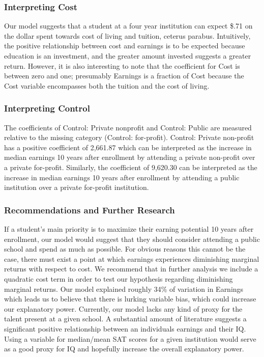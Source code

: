 \documentclass[%
 reprint,
 amsmath,amssymb,
 aps,
]{revtex4-1}
\begin{document}
\subsubsection{Interpreting Cost}
Our model suggests that a student at a four year institution can expect \$.71 on the dollar spent towards cost of living and tuition, ceterus parabus. Intuitively, the positive relationship between cost and earnings is to be expected because education is an investment, and the greater amount invested suggests a greater return. However, it is also interesting to note that the coefficient for Cost is between zero and one; presumably Earnings is a fraction of Cost because the Cost variable encompasses both the tuition and the cost of living. 

\subsubsection{Interpreting Control}
The coefficients of Control: Private nonprofit and Control: Public are measured relative to the missing category (Control: for-profit).  Control: Private non-profit has a positive coefficient of 2,661.87 which can be interpreted as the increase in median earnings 10 years after enrollment by attending a private non-profit over a private for-profit.  Similarly, the coefficient of 9,620.30 can be interpreted as the increase in median earnings 10 years after enrollment by attending a public institution over a private for-profit institution.


\subsubsection{Recommendations and Further Research}
If a student's main priority is to maximize their earning potential 10 years after enrollment, our model would suggest that they should consider attending a public school and spend as much as possible. For obvious reasons this cannot be the case, there must exist a point at which earnings experiences diminishing marginal returns with respect to cost. We recommend that in further analysis we include a quadratic cost term in order to test our hypothesis regarding diminishing marginal returns. Our model explained roughly 34\% of variation in Earnings which leads us to believe that there is lurking variable bias, which could increase our explanatory power.  Currently, our model lacks any kind of proxy for the talent present at a given school.  A substantial amount of literature suggests a significant positive relationship between an individuals earnings and their IQ. Using a variable for median/mean SAT scores for a given institution would serve as a good proxy for IQ and hopefully increase the overall explanatory power.  
\end{document}
